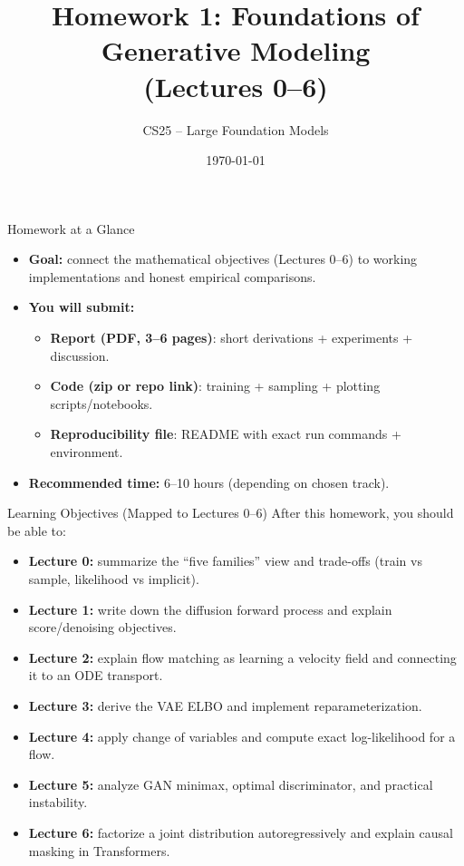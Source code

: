 \documentclass[aspectratio=169]{beamer}
\title[HW1: Generative Models]{Homework 1: Foundations of Generative Modeling\\(Lectures 0--6)}
\author{CS25 -- Large Foundation Models}
\institute[BIMSA]{Beijing Institute of Mathematical Sciences and Applications}
\date{\today}
\begin{document}
\begin{frame}
  \titlepage
\end{frame}

\begin{frame}{Homework at a Glance}
\small
\begin{itemize}
  \item \textbf{Goal:} connect the mathematical objectives (Lectures 0--6) to working implementations and honest empirical comparisons.
  \item \textbf{You will submit:}
  \begin{itemize}
    \item \textbf{Report (PDF, 3--6 pages)}: short derivations + experiments + discussion.
    \item \textbf{Code (zip or repo link)}: training + sampling + plotting scripts/notebooks.
    \item \textbf{Reproducibility file}: README with exact run commands + environment.
  \end{itemize}
  \item \textbf{Recommended time:} 6--10 hours (depending on chosen track).
\end{itemize}
\end{frame}

\begin{frame}{Learning Objectives (Mapped to Lectures 0--6)}
\small
After this homework, you should be able to:
\begin{itemize}
  \item \textbf{Lecture 0:} summarize the ``five families'' view and trade-offs (train vs sample, likelihood vs implicit).
  \item \textbf{Lecture 1:} write down the diffusion forward process and explain score/denoising objectives.
  \item \textbf{Lecture 2:} explain flow matching as learning a velocity field and connecting it to an ODE transport.
  \item \textbf{Lecture 3:} derive the VAE ELBO and implement reparameterization.
  \item \textbf{Lecture 4:} apply change of variables and compute exact log-likelihood for a flow.
  \item \textbf{Lecture 5:} analyze GAN minimax, optimal discriminator, and practical instability.
  \item \textbf{Lecture 6:} factorize a joint distribution autoregressively and explain causal masking in Transformers.
\end{itemize}
\end{frame}
\end{document}
